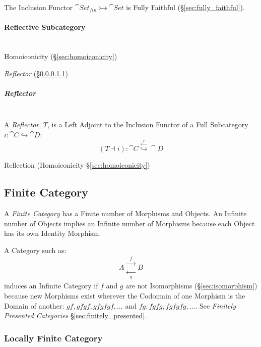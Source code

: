 The Inclusion Functor $\cat{Set}_{fin} \rightarrowtail
\cat{Set}$ is Fully Faithful (\S\ref{sec:fully_faithful}).



\paragraph{Reflective Subcategory}\label{sec:reflective_subcategory}
\hfill \\

Homoiconicity (\S\ref{sec:homoiconicity})

\emph{Reflector} (\S\ref{sec:reflector})


\subparagraph{Reflector}\label{sec:reflector}
\hfill \\


A \emph{Reflector}, $T$, is a Left Adjoint to the Inclusion Functor of
a Full Subcategory $i : \cat{C} \hookrightarrow \cat{D}$:
\[
  (T \dashv i) :
  \cat{C} \stackrel{\xleftarrow{T}}{\hookrightarrow} \cat{D}
\]

Reflection (Homoiconicity \S\ref{sec:homoiconicity})



\subsection{Finite Category}\label{sec:finite_category}

A \emph{Finite Category} has a Finite number of Morphisms and Objects.
An Infinite number of Objects implies an Infinite number of Morphisms
because each Object has its own Identity Morphism.

A Category such as:
\[
  A
  \begin{matrix}
  \xrightarrow{\;\;f\;\;}\\
  \xleftarrow[\;\;g\;\;]{}
  \end{matrix}
  B
\]
induces an Infinite Category if $f$ and $g$ are not Isomorphisms
(\S\ref{sec:isomorphism}) because new Morphisms exist wherever the
Codomain of one Morphism is the Domain of another: $gf, gfgf, gfgfgf,
\ldots$ and $fg, fgfg, fgfgfg, \ldots$. See \emph{Finitely Presented
  Categories} \S\ref{sec:finitely_presented}.



\subsubsection{Locally Finite Category}
\label{sec:locally_finite_category}



